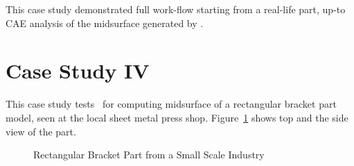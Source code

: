 
%

This case study demonstrated full work-flow starting from a real-life part, up-to CAE analysis of the midsurface generated by \mysystemname.



\section{Case Study IV}

This case study tests \mysystemname~for computing midsurface of a rectangular bracket part model, seen at the local sheet metal press shop. Figure~\ref{fig:results:jbmreallifepart} shows top and the side view of the part.


\begin{figure}[!h]
\centering     %
{} \qquad
{}
\caption{Rectangular Bracket Part from a Small Scale Industry}
\label{fig:results:jbmreallifepart}
\end{figure}

